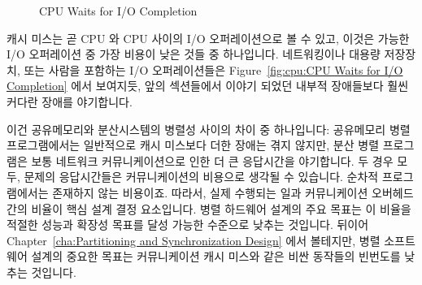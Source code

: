 \begin{figure}[tb]
\centering
{}
\caption{CPU Waits for I/O Completion}
\end{figure}

캐시 미스는 곧 CPU 와 CPU 사이의 I/O 오퍼레이션으로 볼 수 있고, 이것은 가능한
I/O 오퍼레이션 중 가장 비용이 낮은 것들 중 하나입니다.
네트워킹이나 대용량 저장장치, 또는 사람을 포함하는 I/O 오퍼레이션들은
Figure~\ref{fig:cpu:CPU Waits for I/O Completion} 에서 보여지듯, 앞의
섹션들에서 이야기 되었던 내부적 장애들보다 훨씬 커다란 장애를 야기합니다.

이건 공유메모리와 분산시스템의 병렬성 사이의 차이 중 하나입니다:
공유메모리 병렬 프로그램에서는 일반적으로 캐시 미스보다 더한 장애는 겪지
않지만, 분산 병렬 프로그램은 보통 네트워크 커뮤니케이션으로 인한 더 큰
응답시간을 야기합니다.
두 경우 모두, 문제의 응답시간들은 커뮤니케이션의 비용으로 생각될 수 있습니다.
순차적 프로그램에서는 존재하지 않는 비용이죠.
따라서, 실제 수행되는 일과 커뮤니케이션 오버헤드 간의 비율이 핵심 설계 결정
요소입니다.
병렬 하드웨어 설계의 주요 목표는 이 비율을 적절한 성능과 확장성 목표를 달성
가능한 수준으로 낮추는 것입니다.
뒤이어 Chapter~\ref{cha:Partitioning and Synchronization Design} 에서
볼테지만, 병렬 소프트웨어 설계의 중요한 목표는 커뮤니케이션 캐시 미스와 같은
비싼 동작들의 빈번도를 낮추는 것입니다.

